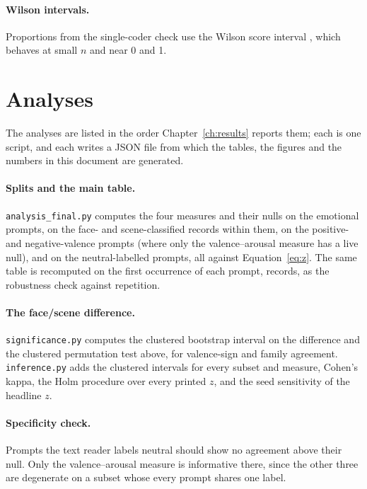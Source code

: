 \paragraph{Wilson intervals.} Proportions from the single-coder check use the Wilson score interval \cite{wilson1927probable}, which behaves at small $n$ and near 0 and 1.

\section{Analyses}
\label{sec:method-analyses}

The analyses are listed in the order Chapter~\ref{ch:results} reports them; each is one script, and each writes a JSON file from which the tables, the figures and the numbers in this document are generated.

\paragraph{Splits and the main table.} \texttt{analysis\_final.py} computes the four measures and their nulls on the emotional prompts, on the face- and scene-classified records within them, on the positive- and negative-valence prompts (where only the valence--arousal measure has a live null), and on the neutral-labelled prompts, all against Equation~\ref{eq:z}. The same table is recomputed on the first occurrence of each prompt, \nDistinct{} records, as the robustness check against repetition.

\paragraph{The face/scene difference.} \texttt{significance.py} computes the clustered bootstrap interval on the difference and the clustered permutation test above, for valence-sign and family agreement. \texttt{inference.py} adds the clustered intervals for every subset and measure, Cohen's kappa, the Holm procedure over every printed $z$, and the seed sensitivity of the headline $z$.

\paragraph{Specificity check.} Prompts the text reader labels neutral should show no agreement above their null. Only the valence--arousal measure is informative there, since the other three are degenerate on a subset whose every prompt shares one label.

